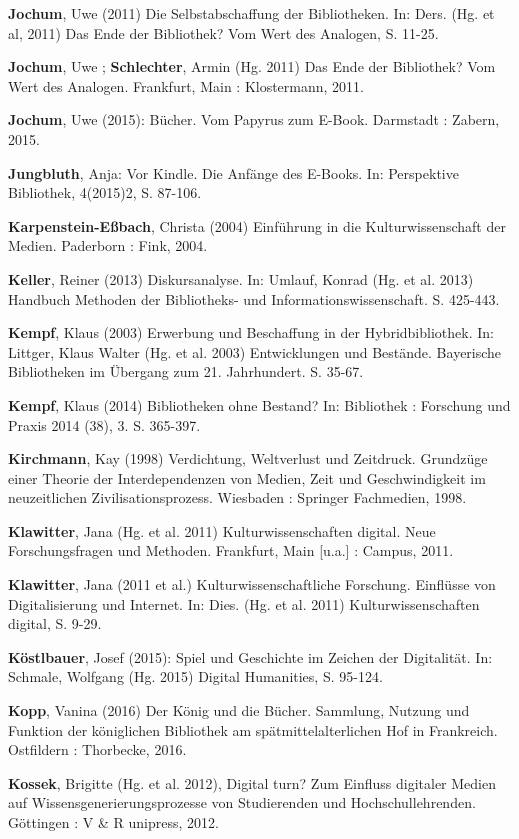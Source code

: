 \documentclass[a4paper,
fontsize=11pt,
oneside,
numbers=noperiodatend,
parskip=half-,
bibliography=totoc,
final
]{scrartcl}
\begin{document}
\textbf{Jochum}, Uwe (2011) Die Selbstabschaffung der Bibliotheken. In:
Ders. (Hg. et al, 2011) Das Ende der Bibliothek? Vom Wert des Analogen,
S. 11-25.

\textbf{Jochum}, Uwe ; \textbf{Schlechter}, Armin (Hg. 2011) Das Ende
der Bibliothek? Vom Wert des Analogen. Frankfurt, Main : Klostermann,
2011.

\textbf{Jochum}, Uwe (2015): Bücher. Vom Papyrus zum E-Book. Darmstadt :
Zabern, 2015.

\textbf{Jungbluth}, Anja: Vor Kindle. Die Anfänge des E-Books. In:
Perspektive Bibliothek, 4(2015)2, S. 87-106.

\textbf{Karpenstein-Eßbach}, Christa (2004) Einführung in die
Kulturwissenschaft der Medien. Paderborn : Fink, 2004.

\textbf{Keller}, Reiner (2013) Diskursanalyse. In: Umlauf, Konrad (Hg.
et al. 2013) Handbuch Methoden der Bibliotheks- und
Informationswissenschaft. S. 425-443.

\textbf{Kempf}, Klaus (2003) Erwerbung und Beschaffung in der
Hybridbibliothek. In: Littger, Klaus Walter (Hg. et al. 2003)
Entwicklungen und Bestände. Bayerische Bibliotheken im Übergang zum 21.
Jahrhundert. S. 35-67.

\textbf{Kempf}, Klaus (2014) Bibliotheken ohne Bestand? In: Bibliothek :
Forschung und Praxis 2014 (38), 3. S. 365-397.

\textbf{Kirchmann}, Kay (1998) Verdichtung, Weltverlust und Zeitdruck.
Grundzüge einer Theorie der Interdependenzen von Medien, Zeit und
Geschwindigkeit im neuzeitlichen Zivilisationsprozess. Wiesbaden :
Springer Fachmedien, 1998.

\textbf{Klawitter}, Jana (Hg. et al. 2011) Kulturwissenschaften digital.
Neue Forschungsfragen und Methoden. Frankfurt, Main {[}u.a.{]} : Campus,
2011.

\textbf{Klawitter}, Jana (2011 et al.) Kulturwissenschaftliche
Forschung. Einflüsse von Digitalisierung und Internet. In: Dies. (Hg. et
al. 2011) Kulturwissenschaften digital, S. 9-29.

\textbf{Köstlbauer}, Josef (2015): Spiel und Geschichte im Zeichen der
Digitalität. In: Schmale, Wolfgang (Hg. 2015) Digital Humanities, S.
95-124.

\textbf{Kopp}, Vanina (2016) Der König und die Bücher. Sammlung, Nutzung
und Funktion der königlichen Bibliothek am spätmittelalterlichen Hof in
Frankreich. Ostfildern : Thorbecke, 2016.

\textbf{Kossek}, Brigitte (Hg. et al. 2012), Digital turn? Zum Einfluss
digitaler Medien auf Wissensgenerierungsprozesse von Studierenden und
Hochschullehrenden. Göttingen : V \& R unipress, 2012.
\end{document}
